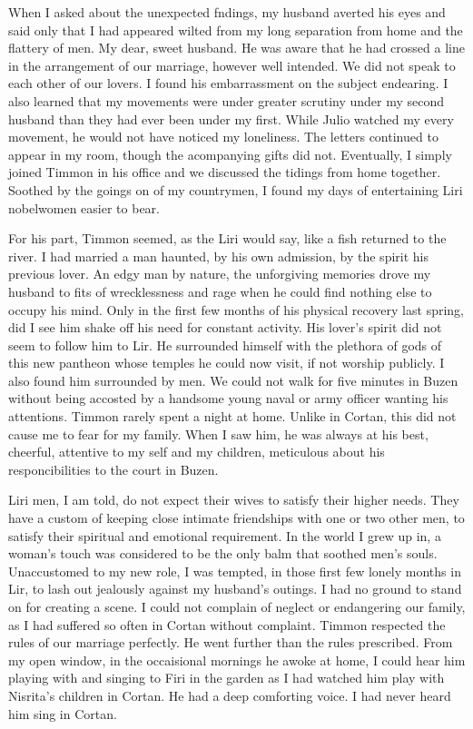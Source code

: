 \documentclass{article}
\begin{document}
When I asked about the unexpected fndings, my husband averted his eyes and said only that I had appeared wilted from my long separation from home and the flattery of men. My dear, sweet husband. He was aware that he had crossed a line in the arrangement of our marriage, however well intended. We did not speak to each other of our lovers. I found his embarrassment on the subject endearing. I also learned that my movements were under greater scrutiny under my second husband than they had ever been under my first. While Julio watched my every movement, he would not have noticed my loneliness. The letters continued to appear in my room, though the acompanying gifts did not. Eventually, I simply joined Timmon in his office and we discussed the tidings from home together. Soothed by the goings on of my countrymen, I found my days of entertaining Liri nobelwomen easier to bear.

For his part, Timmon seemed, as the Liri would say, like a fish returned to the river. I had married a man haunted, by his own admission, by the spirit his previous lover. An edgy man by nature, the unforgiving memories drove my husband to fits of wrecklessness and rage when he could find nothing else to occupy his mind. Only in the first few months of his physical recovery last spring, did I see him shake off his need for constant activity. His lover's spirit did not seem to follow him to Lir. He surrounded himself with the plethora of gods of this new pantheon whose temples he could now visit, if not worship publicly. I also found him surrounded by men. We could not walk for five minutes in Buzen without being accosted by a handsome young naval or army officer wanting his attentions. Timmon rarely spent a night at home. Unlike in Cortan, this did not cause me to fear for my family. When I saw him, he was always at his best, cheerful, attentive to my self and my children, meticulous about his responcibilities to the court in Buzen. 

Liri men, I am told, do not expect their wives to satisfy their higher needs. They have a custom of keeping close intimate friendships with one or two other men, to satisfy their spiritual and emotional requirement. In the world I grew up in, a woman's touch was considered to be the only balm that soothed men's souls. Unaccustomed to my new role, I was tempted, in those first few lonely months in Lir, to lash out jealously against my husband's outings. I had no ground to stand on for creating a scene. I could not complain of neglect or endangering our family, as I had suffered so often in Cortan without complaint. Timmon respected the rules of our marriage perfectly. He went further than the rules prescribed. From my open window, in the occaisional mornings he awoke at home, I could hear him playing with and singing to Firi in the garden as I had watched him play with Nisrita's children in Cortan. He had a deep comforting voice. I had never heard him sing in Cortan.
\end{document}
